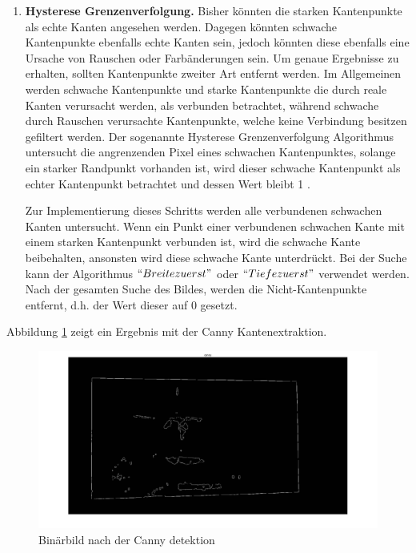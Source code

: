 \begin{enumerate}
	\item \textbf{Hysterese Grenzenverfolgung.} Bisher könnten die starken Kantenpunkte als echte Kanten angesehen werden. Dagegen könnten schwache Kantenpunkte ebenfalls echte Kanten sein, jedoch könnten diese ebenfalls eine Ursache von Rauschen oder Farbänderungen sein. Um genaue Ergebnisse zu erhalten, sollten Kantenpunkte zweiter Art entfernt werden. Im Allgemeinen werden schwache Kantenpunkte und starke Kantenpunkte die durch reale Kanten verursacht werden, als verbunden betrachtet, während schwache durch Rauschen verursachte Kantenpunkte, welche keine Verbindung besitzen gefiltert werden. Der sogenannte Hysterese Grenzenverfolgung Algorithmus untersucht die angrenzenden Pixel eines schwachen Kantenpunktes, solange ein starker Randpunkt vorhanden ist, wird dieser schwache Kantenpunkt als echter Kantenpunkt betrachtet und dessen Wert bleibt 1 .
	
Zur Implementierung dieses Schritts werden alle verbundenen schwachen Kanten untersucht. Wenn ein Punkt einer verbundenen schwachen Kante mit einem starken Kantenpunkt verbunden ist, wird die schwache Kante beibehalten, ansonsten wird diese schwache Kante unterdrückt. Bei der Suche kann der Algorithmus $ ``Breite zuerst" $ oder $ ``Tiefe zuerst" $ verwendet werden. Nach der gesamten Suche des Bildes, werden die Nicht-Kantenpunkte entfernt, d.h. der Wert dieser auf 0 gesetzt.
	
\end{enumerate}

Abbildung \ref{fig:Binärbild nach der Canny detektion} zeigt ein Ergebnis mit der Canny Kantenextraktion.

\begin{figure}[H]
 \centering 
  \includegraphics[keepaspectratio,width=1.0\textwidth]{images/4_ZweiteErfahrung/Canny/canny.pdf}
 \caption{Binärbild nach der Canny detektion}
 \label{fig:Binärbild nach der Canny detektion}
\end{figure} 

